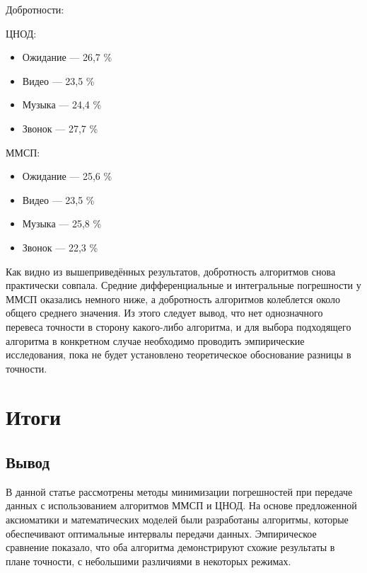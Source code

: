 \documentclass[12pt]{report}
\begin{document}
Добротности:
\vspace{0.5cm}

\begin{minipage}[b]{0.45\textwidth}
    \centering ЦНОД:
    \begin{itemize}
        \item Ожидание — 26,7 \%
        \item Видео — 23,5 \%
        \item Музыка — 24,4 \%
        \item Звонок — 27,7 \%
    \end{itemize}\end{minipage}
\hfill
\begin{minipage}[b]{0.45\textwidth}
    \centering ММСП:
    \begin{itemize}
        \item Ожидание — 25,6 \%
        \item Видео — 23,5 \%
        \item Музыка — 25,8 \%
        \item Звонок — 22,3 \%
    \end{itemize}
\end{minipage}

Как видно из вышеприведённых результатов, добротность алгоритмов снова практически совпала. Средние дифференциальные и интегральные погрешности у ММСП оказались немного ниже, а добротность алгоритмов колеблется около общего среднего значения. Из этого следует вывод, что нет однозначного перевеса точности в сторону какого-либо алгоритма, и для выбора подходящего алгоритма в конкретном случае необходимо проводить эмпирические исследования, пока не будет установлено теоретическое обоснование разницы в точности.

\section{Итоги}
\subsection{Вывод}
В данной статье рассмотрены методы минимизации погрешностей при передаче данных с использованием алгоритмов ММСП и ЦНОД. На основе предложенной аксиоматики и математических моделей были разработаны алгоритмы, которые обеспечивают оптимальные интервалы передачи данных. Эмпирическое сравнение показало, что оба алгоритма демонстрируют схожие результаты в плане точности, с небольшими различиями в некоторых режимах. 
\end{document}
